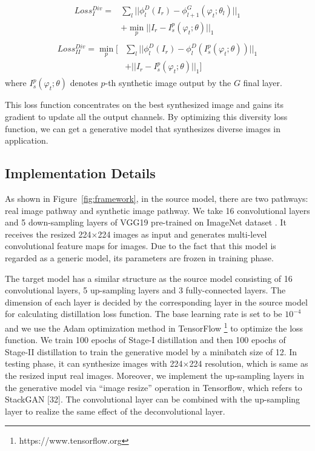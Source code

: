 \documentclass[sigconf]{acmart}
\begin{document}
\begin{align}
	\begin{split}
		Loss_{I}^{Div} = & \sum_l || \phi_l^D(I_r) - \phi_{l+1}^G(\varphi_t;\theta_l) ||_1 \\
		& + \min_p || I_r - I^p_s(\varphi_t;\theta) ||_1
	\end{split}
\end{align}
\begin{align}
	\begin{split}
		Loss_{II}^{Div} = \min_p [ & \sum_l || \phi_l^D(I_r) - \phi_l^D(I^p_s(\varphi_t;\theta)) ||_1 \\
		& + || I_r - I^p_s(\varphi_t;\theta) ||_1 ]
	\end{split}
\end{align}
where $I^p_s(\varphi_t;\theta)$ denotes $p$-th synthetic image output by the $G$ final layer.

This loss function concentrates on the best synthesized image and gains its gradient to update all the output channels. By optimizing this diversity loss function, we can get a generative model that synthesizes diverse images in application.

\subsection{Implementation Details}
As shown in Figure~\ref{fig:framework}, in the source model, there are two pathways: real image pathway and synthetic image pathway. We take 16 convolutional layers and 5 down-sampling layers of VGG19 \cite{simonyan2014very} pre-trained on ImageNet dataset \cite{krizhevsky2012imagenet}. It receives the resized 224$\times$224 images as input and generates multi-level convolutional feature maps for images. Due to the fact that this model is regarded as a generic model, its parameters are frozen in training phase.

The target model has a similar structure as the source model consisting of 16 convolutional layers, 5 up-sampling layers and 3 fully-connected layers. The dimension of each layer is decided by the corresponding layer in the source model for calculating distillation loss function. The base learning rate is set to be $10^{-4}$ and we use the Adam optimization method \cite{kingma2014adam} in TensorFlow \footnote{https://www.tensorflow.org} to optimize the loss function. We train 100 epochs of Stage-I distillation and then 100 epochs of Stage-II distillation to train the generative model by a minibatch size of 12. In testing phase, it can synthesize images with 224$\times$224 resolution, which is same as the resized input real images. Moreover, we implement the up-sampling layers in the generative model via ``image resize'' operation in Tensorflow, which refers to StackGAN [32]. The convolutional layer can be combined with the up-sampling layer to realize the same effect of the deconvolutional layer.
\end{document}
